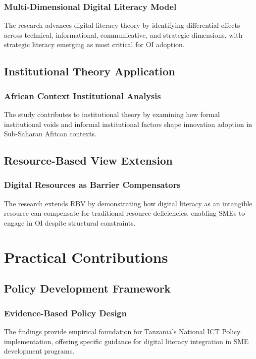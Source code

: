 \subsubsection{Multi-Dimensional Digital Literacy Model}
The research advances digital literacy theory by identifying differential effects across technical, informational, communicative, and strategic dimensions, with strategic literacy emerging as most critical for OI adoption.

\subsection{Institutional Theory Application}

\subsubsection{African Context Institutional Analysis}
The study contributes to institutional theory by examining how formal institutional voids and informal institutional factors shape innovation adoption in Sub-Saharan African contexts.

\subsection{Resource-Based View Extension}

\subsubsection{Digital Resources as Barrier Compensators}
The research extends RBV by demonstrating how digital literacy as an intangible resource can compensate for traditional resource deficiencies, enabling SMEs to engage in OI despite structural constraints.

\section{Practical Contributions}

\subsection{Policy Development Framework}

\subsubsection{Evidence-Based Policy Design}
The findings provide empirical foundation for Tanzania's National ICT Policy implementation, offering specific guidance for digital literacy integration in SME development programs.

